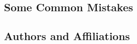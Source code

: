 \documentclass[conference]{IEEEtran}
\begin{document}
\subsection{Some Common Mistakes}

\subsection{Authors and Affiliations}
\end{document}
